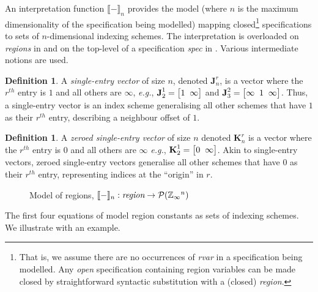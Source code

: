 \documentclass[10pt,preprint,numbers]{sigplanconf}
\newcounter{block}
\theoremstyle{definition}
\newtheorem{definition}[block]{Definition}
\newcommand{\eg}{\emph{e.g.}}
\newcommand{\interp}[1]{\llbracket{#1}\rrbracket}
\newcommand{\vtwoh}[2]{\setlength{\arraycolsep}{0em}
\left[\begin{array}{cc}#1 \; & \; #2\end{array}\right]}
\newcommand{\vthreeh}[3]{\setlength{\arraycolsep}{0em}
\left[\begin{array}{ccc}#1 \; & \; #2 \; & \; #3\end{array}\right]}
\newcommand{\singleEntry}[2]{\textbf{J}_{#2}^{#1}}
\newcommand{\zeroEntry}[2]{\textbf{K}_{#2}^{#1}}
\begin{document}
An interpretation function $\interp{-}_n$ provides the model 
(where $n$ is the maximum dimensionality of the specification being
modelled) mapping closed\footnote{That is, we assume there are no
  occurrences of \textit{rvar} in a specification being modelled.  Any
  \emph{open} specification containing region variables can be made
  closed by straightforward syntactic substitution with a (closed)
  \textit{region}.} specifications to sets of
$n$-dimensional indexing schemes. The interpretation is overloaded on
\emph{regions} in  and on the top-level
of a specification \textit{spec} in .
Various intermediate notions are used.

\begin{definition}A \emph{single-entry vector} of size $n$, denoted
$\singleEntry{r}{n}$, is a vector where the $r^{th}$ entry is $1$
and all others are $\infty$, \eg{}, $\singleEntry{1}{2} =
\vtwoh{1}{\infty}$ and $\singleEntry{2}{3} = \vthreeh{\infty}{1}{\infty}$.
Thus, a single-entry vector is an index scheme generalising 
all other schemes that have $1$ as their $r^{th}$ entry,
describing a neighbour offset of $1$.
\end{definition}

\begin{definition}
A \emph{zeroed single-entry vector} of size $n$ denoted
$\zeroEntry{r}{n}$ is a vector where the $r^{th}$ entry is $0$ and all others
are $\infty$ \eg{}, $\zeroEntry{1}{2} = \vtwoh{0}{\infty}$.
Akin to single-entry vectors, zeroed single-entry vectors
generalise all other schemes
that have $0$ as their $r^{th}$ entry, representing indices at
the ``origin'' in $r$.
\end{definition}

\begin{figure}[t]
\vspace{-0.9em}

\caption{Model of regions,
$\interp{-}_n : \textit{region} \rightarrow \mathcal{P}(\domainVal{}^n)$}
\label{fig:region-model}
\vspace{-1em}
\end{figure}

\noindent
The first four equations of 
model region constants as sets of indexing
schemes. We illustrate with an example.
\end{document}
